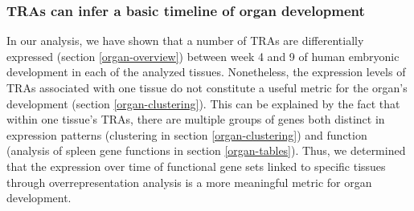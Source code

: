 \documentclass[
]{article}
\begin{document}
\hypertarget{dis-organ}{%
\subsubsection{TRAs can infer a basic timeline of organ development}\label{dis-organ}}

In our analysis, we have shown that a number of TRAs are differentially expressed (section \ref{organ-overview}) between week 4 and 9 of human embryonic development in each of the analyzed tissues. Nonetheless, the expression levels of TRAs associated with one tissue do not constitute a useful metric for the organ's development (section \ref{organ-clustering}). This can be explained by the fact that within one tissue's TRAs, there are multiple groups of genes both distinct in expression patterns (clustering in section \ref{organ-clustering}) and function (analysis of spleen gene functions in section \ref{organ-tables}). Thus, we determined that the expression over time of functional gene sets linked to specific tissues through overrepresentation analysis is a more meaningful metric for organ development.
\end{document}
